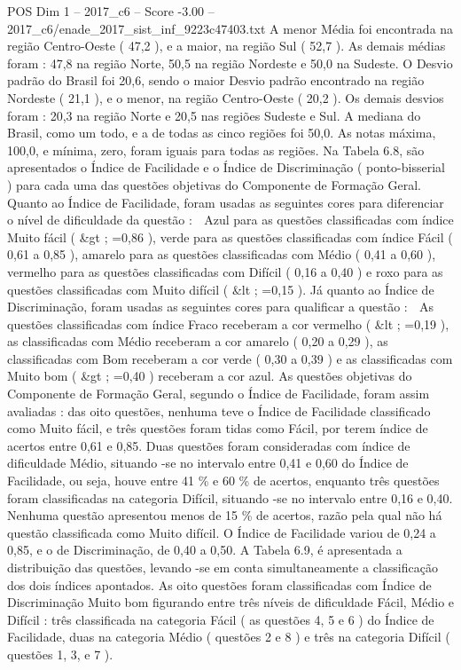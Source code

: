 \begin{textsample}{POS Dim 1 – 2017\_c6 – Score -3.00 – 2017\_c6/enade\_2017\_sist\_inf\_9223c47403.txt}
A menor Média foi encontrada na região Centro-Oeste ( 47,2 ), e a maior, na região Sul ( 52,7 ).
As demais médias foram : 47,8 na região Norte, 50,5 na região Nordeste e 50,0 na Sudeste.
O Desvio padrão do Brasil foi 20,6, sendo o maior Desvio padrão encontrado na região Nordeste ( 21,1 ), e o menor, na região Centro-Oeste ( 20,2 ).
Os demais desvios foram : 20,3 na região Norte e 20,5 nas regiões Sudeste e Sul.
A mediana do Brasil, como um todo, e a de todas as cinco regiões foi 50,0.
As notas máxima, 100,0, e mínima, zero, foram iguais para todas as regiões.
Na Tabela 6.8, são apresentados o Índice de Facilidade e o Índice de Discriminação ( ponto-bisserial ) para cada uma das questões objetivas do Componente de Formação Geral.
Quanto ao Índice de Facilidade, foram usadas as seguintes cores para diferenciar o nível de dificuldade da questão :  Azul para as questões classificadas com índice Muito fácil ( \&gt ; =0,86 ), verde para as questões classificadas com índice Fácil ( 0,61 a 0,85 ), amarelo para as questões classificadas com Médio ( 0,41 a 0,60 ), vermelho para as questões classificadas com Difícil ( 0,16 a 0,40 ) e roxo para as questões classificadas com Muito difícil ( \&lt ; =0,15 ).
Já quanto ao Índice de Discriminação, foram usadas as seguintes cores para qualificar a questão :  As questões classificadas com índice Fraco receberam a cor vermelho ( \&lt ; =0,19 ), as classificadas com Médio receberam a cor amarelo ( 0,20 a 0,29 ), as classificadas com Bom receberam a cor verde ( 0,30 a 0,39 ) e as classificadas com Muito bom ( \&gt ; =0,40 ) receberam a cor azul.
As questões objetivas do Componente de Formação Geral, segundo o Índice de Facilidade, foram assim avaliadas : das oito questões, nenhuma teve o Índice de Facilidade classificado como Muito fácil, e três questões foram tidas como Fácil, por terem índice de acertos entre 0,61 e 0,85.
Duas questões foram consideradas com índice de dificuldade Médio, situando -se no intervalo entre 0,41 e 0,60 do Índice de Facilidade, ou seja, houve entre 41 \% e 60 \% de acertos, enquanto três questões foram classificadas na categoria Difícil, situando -se no intervalo entre 0,16 e 0,40.
Nenhuma questão apresentou menos de 15 \% de acertos, razão pela qual não há questão classificada como Muito difícil.
O Índice de Facilidade variou de 0,24 a 0,85, e o de Discriminação, de 0,40 a 0,50.
A Tabela 6.9, é apresentada a distribuição das questões, levando -se em conta simultaneamente a classificação dos dois índices apontados.
As oito questões foram classificadas com Índice de Discriminação Muito bom figurando entre três níveis de dificuldade Fácil, Médio e Difícil : três classificada na categoria Fácil ( as questões 4, 5 e 6 ) do Índice de Facilidade, duas na categoria Médio ( questões 2 e 8 ) e três na categoria Difícil ( questões 1, 3, e 7 ).

\end{textsample}
